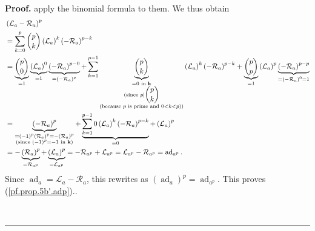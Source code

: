 \documentclass[numbers=enddot,12pt,final,onecolumn,notitlepage]{scrartcl}%
\theoremstyle{definition}
\newenvironment{proof}[1][Proof]{\noindent\textbf{#1.} }{\ \rule{0.5em}{0.5em}}
\let\sumnonlimits\sum
\renewcommand{\sum}{\sumnonlimits\limits}
\begin{document}
\begin{proof}
{apply the binomial formula to them. We thus obtain%
\begin{align*}
&  \left(  \mathcal{L}_{a}-\mathcal{R}_{a}\right)  ^{p}\\
&  =\sum_{k=0}^{p}\dbinom{p}{k}\left(  \mathcal{L}_{a}\right)  ^{k}\left(
-\mathcal{R}_{a}\right)  ^{p-k}\\
&  =\underbrace{\dbinom{p}{0}}_{=1}\underbrace{\left(  \mathcal{L}_{a}\right)
^{0}}_{=1}\underbrace{\left(  -\mathcal{R}_{a}\right)  ^{p-0}}_{=\left(
-\mathcal{R}_{a}\right)  ^{p}}+\sum_{k=1}^{p-1}\underbrace{\dbinom{p}{k}%
}_{\substack{=0\text{ in }\mathbf{k}\\\text{(since }p\mid\dbinom{p}%
{k}\\\text{(because }p\text{ is prime and }0<k<p\text{))}}}\left(
\mathcal{L}_{a}\right)  ^{k}\left(  -\mathcal{R}_{a}\right)  ^{p-k}%
+\underbrace{\dbinom{p}{p}}_{=1}\left(  \mathcal{L}_{a}\right)  ^{p}%
\underbrace{\left(  -\mathcal{R}_{a}\right)  ^{p-p}}_{=\left(  -\mathcal{R}%
_{a}\right)  ^{0}=1}\\
&  =\underbrace{\left(  -\mathcal{R}_{a}\right)  ^{p}}_{\substack{=\left(
-1\right)  ^{p}\left(  \mathcal{R}_{a}\right)  ^{p}=-\left(  \mathcal{R}%
_{a}\right)  ^{p}\\\text{(since }\left(  -1\right)  ^{p}=-1\text{ in
}\mathbf{k}\text{)}}}+\underbrace{\sum_{k=1}^{p-1}0\left(  \mathcal{L}%
_{a}\right)  ^{k}\left(  -\mathcal{R}_{a}\right)  ^{p-k}}_{=0}+\left(
\mathcal{L}_{a}\right)  ^{p}\\
&  =-\underbrace{\left(  \mathcal{R}_{a}\right)  ^{p}}_{=\mathcal{R}_{a^{p}}%
}+\underbrace{\left(  \mathcal{L}_{a}\right)  ^{p}}_{=\mathcal{L}_{a^{p}}%
}=-\mathcal{R}_{a^{p}}+\mathcal{L}_{a^{p}}=\mathcal{L}_{a^{p}}-\mathcal{R}%
_{a^{p}}=\operatorname*{ad}\nolimits_{a^{p}}.
\end{align*}
Since $\operatorname*{ad}\nolimits_{a}=\mathcal{L}_{a}-\mathcal{R}_{a}$, this
rewrites as $\left(  \operatorname*{ad}\nolimits_{a}\right)  ^{p}%
=\operatorname*{ad}\nolimits_{a^{p}}$. This proves (\ref{pf.prop.5b'.adp}).}.


\end{proof}
\end{document}
